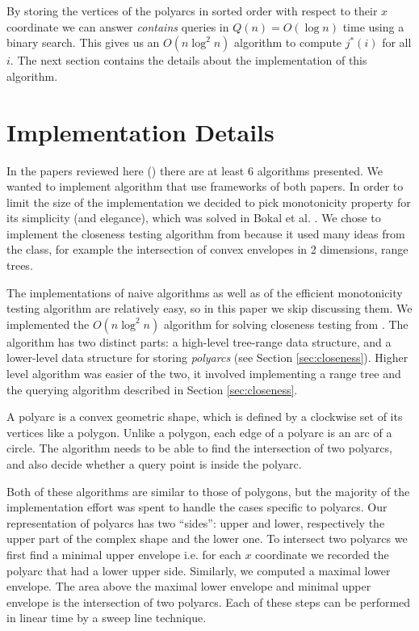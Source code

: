 \documentclass{article}
\begin{document}
By storing the vertices of the polyarcs in sorted order with respect
to their $x$ coordinate we can answer \textit{contains} queries in
$Q(n) = O(\log n)$ time using a binary search. This gives us an
$O(n\log^2 n)$ algorithm to compute $j^*(i)$ for all $i$. The next
section contains the details about the implementation of this
algorithm.

\section{Implementation Details}
\label{sec:implementation}
In the papers reviewed here (\cite{bokal2015,chan2016}) there are
at least 6 algorithms presented. We wanted to implement algorithm
that use frameworks of both papers. In order to limit the size of
the implementation we decided to pick monotonicity property for its
simplicity (and elegance), which was solved in Bokal et al.
\cite{bokal2015}. We chose to implement the closeness testing
algorithm from \cite{chan2016} because it used many ideas from the
class, for example the intersection of convex envelopes in 2
dimensions, range trees.

The implementations of naive algorithms as well as of the efficient
monotonicity testing algorithm are relatively easy, so in this paper
we skip discussing them. We implemented the $O(n \log ^2 n)$ algorithm
for solving closeness testing from \cite{chan2016}.  The algorithm
has two distinct parts: a high-level tree-range data structure, and
a lower-level data structure for storing \textit{polyarcs} (see
Section \ref{sec:closeness}).  Higher level algorithm was easier
of the two, it involved implementing a range tree and the querying
algorithm described in Section \ref{sec:closeness}.

A polyarc is a convex geometric shape, which is defined by a clockwise
set of its vertices like a polygon. Unlike a polygon, each edge of
a polyarc is an arc of a circle. The algorithm needs to be able to
find the intersection of two polyarcs, and also decide whether a
query point is inside the polyarc.

Both of these algorithms are similar to those of polygons, but the
majority of the implementation effort was spent to handle the cases
specific to polyarcs. Our representation of polyarcs has two
``sides'': upper and lower, respectively the upper part of the
complex shape and the lower one. To intersect two polyarcs we first
find a minimal upper envelope i.e. for each $x$ coordinate we
recorded the polyarc that had a lower upper side. Similarly, we
computed a maximal lower envelope. The area above the maximal lower
envelope and minimal upper envelope is the intersection of two
polyarcs. Each of these steps can be performed in linear time by a
sweep line technique.
\end{document}
